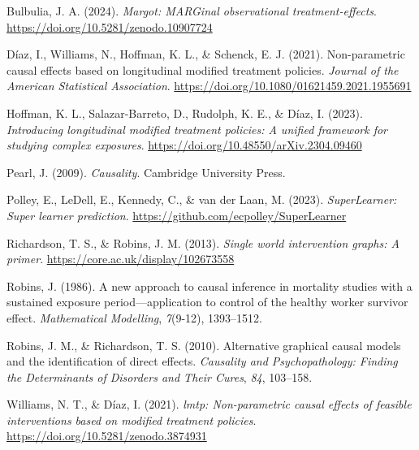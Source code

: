 \documentclass[
  single column]{article}
\newlength{\cslhangindent}
\newenvironment{CSLReferences}[2] %
 {\begin{list}{}{%
  \setlength{\itemindent}{0pt}
  \setlength{\leftmargin}{0pt}
  \setlength{\parsep}{0pt}
  \ifodd #1
   \setlength{\leftmargin}{\cslhangindent}
   \setlength{\itemindent}{-1\cslhangindent}
  \fi
  \setlength{\itemsep}{#2\baselineskip}}}
 {\end{list}}
\begin{document}
\label{refs}
\begin{CSLReferences}{1}{0}
Bulbulia, J. A. (2024). \emph{Margot: MARGinal observational
treatment-effects}. \url{https://doi.org/10.5281/zenodo.10907724}

Díaz, I., Williams, N., Hoffman, K. L., \& Schenck, E. J. (2021).
Non-parametric causal effects based on longitudinal modified treatment
policies. \emph{Journal of the American Statistical Association}.
\url{https://doi.org/10.1080/01621459.2021.1955691}

Hoffman, K. L., Salazar-Barreto, D., Rudolph, K. E., \& Díaz, I. (2023).
\emph{Introducing longitudinal modified treatment policies: A unified
framework for studying complex exposures}.
\url{https://doi.org/10.48550/arXiv.2304.09460}

Pearl, J. (2009). \emph{Causality}. Cambridge University Press.

Polley, E., LeDell, E., Kennedy, C., \& van der Laan, M. (2023).
\emph{SuperLearner: Super learner prediction}.
\url{https://github.com/ecpolley/SuperLearner}

Richardson, T. S., \& Robins, J. M. (2013). \emph{Single world
intervention graphs: A primer}.
\url{https://core.ac.uk/display/102673558}

Robins, J. (1986). A new approach to causal inference in mortality
studies with a sustained exposure period---application to control of the
healthy worker survivor effect. \emph{Mathematical Modelling},
\emph{7}(9-12), 1393--1512.

Robins, J. M., \& Richardson, T. S. (2010). Alternative graphical causal
models and the identification of direct effects. \emph{Causality and
Psychopathology: Finding the Determinants of Disorders and Their Cures},
\emph{84}, 103--158.

Williams, N. T., \& Díaz, I. (2021). \emph{{l}mtp: Non-parametric causal
effects of feasible interventions based on modified treatment policies}.
\url{https://doi.org/10.5281/zenodo.3874931}

\end{CSLReferences}
\end{document}
